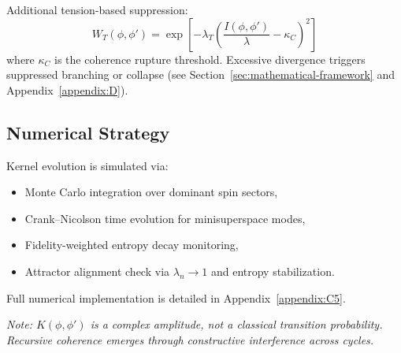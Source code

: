 Additional tension-based suppression:
\[
W_T(\phi,\phi') = \exp\left[
  -\lambda_T \left( \frac{I(\phi, \phi')}{\lambda} - \kappa_C \right)^2
\right]
\]
where \( \kappa_C \) is the coherence rupture threshold. Excessive divergence triggers suppressed branching or collapse (see Section~\ref{sec:mathematical-framework} and Appendix~\ref{appendix:D}).

\subsection{Numerical Strategy}
\label{subsec:numerical}

Kernel evolution is simulated via:
\begin{itemize}
    \item Monte Carlo integration over dominant spin sectors,
    \item Crank–Nicolson time evolution for minisuperspace modes,
    \item Fidelity-weighted entropy decay monitoring,
    \item Attractor alignment check via \( \lambda_n \to 1 \) and entropy stabilization.
\end{itemize}
Full numerical implementation is detailed in Appendix~\ref{appendix:C5}.

\bigskip
\noindent
\textit{Note: \( K(\phi, \phi') \) is a complex amplitude, not a classical transition probability. Recursive coherence emerges through constructive interference across cycles.}
